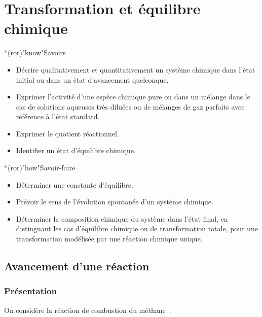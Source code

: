\documentclass[../../main/main.tex]{subfiles}
\begin{document}
\setcounter{chapter}{1}

\chapter{Transformation et \'equilibre chimique}

\vfill

\begin{prgm}
	\begin{tcb}*(ror)"know"{Savoirs}
		\begin{itemize}[label=$\diamond$, leftmargin=10pt]
			\item Décrire qualitativement et quantitativement un
			      système chimique dans l'état initial ou dans un état d'avancement
			      quelconque.
			\item Exprimer l'activité d'une espèce chimique pure ou
			      dans un mélange dans le cas de solutions aqueuses très diluées ou de
			      mélanges de gaz parfaits avec référence à l'état standard.
			\item Exprimer le quotient réactionnel.
			\item Identifier un état d'équilibre chimique.
		\end{itemize}
	\end{tcb}

	\begin{tcb}*(ror)"how"{Savoir-faire}
		\begin{itemize}[label=$\diamond$, leftmargin=10pt]
			\item Déterminer une constante d'équilibre.
			\item Prévoir le sens de l'évolution spontanée d'un système chimique.
			\item Déterminer la composition chimique du système dans l'état final, en
			      distinguant les cas d'équilibre chimique ou de transformation totale,
			      pour une transformation modélisée par une réaction chimique unique.
		\end{itemize}
	\end{tcb}
\end{prgm}

\vfill
\minitoc
\vfill

\newpage

\section{Avancement d'une réaction}
\subsection{Présentation}
On considère la réaction de combustion du méthane~:
\csw{
	\[
		\ce{CH4\gaz{} + 2 O2\gaz{} = CO2\gaz{} + 2H2O\gaz}
	\]
}\vspace{-15pt}
\end{document}
